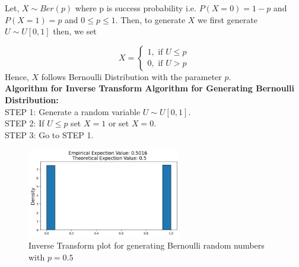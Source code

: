 \begin{example}
    Let, $X\sim Ber(p)$ where p is success probability  i.e.  $P(X=0)= 1-p$ and  $P(X=1)=p$ and $0\le p \le 1$.
    Then, to generate $X$ we first generate $U \sim U[0,1]$ then, we set

    \[
        X=
        \begin{cases}
            1, \text{ if } U\le p \\
            0, \text{ if } U> p
        \end{cases}
    \] 
    Hence, $X$ follows Bernoulli Distribution with the parameter $p$.\\ 
    \textbf{Algorithm for Inverse Transform Algorithm for Generating Bernoulli Distribution:}\\ 
    STEP 1: Generate a random variable $U\sim U[0,1]$.\\ 
    STEP 2: If $U\le p$ set $X=1$ or set  $X=0$. \\ 
    STEP 3: Go to  STEP 1.

    \begin{figure}[H]
        \centering
        \includegraphics[width=0.6\textwidth]{images/ber_ITA.png}
        \caption{Inverse Transform plot for generating  Bernoulli random numbers with $p=0.5$}
    \end{figure}
\end{example}

